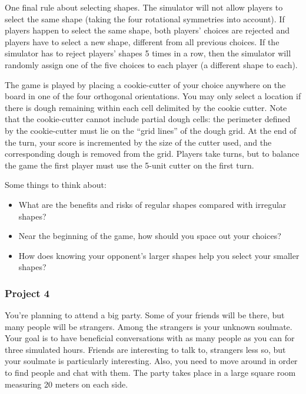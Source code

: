 One final rule about selecting shapes.  The simulator will not allow players to select
the same shape (taking the four rotational symmetries into account).  If players
happen to select the same shape, both players' choices are rejected and players have to
select a new shape, different from all previous choices.  If the simulator has to reject
players' shapes 5 times in a row, then the simulator will randomly assign one of the five
choices to each player (a different shape to each).

The game is played by placing a cookie-cutter of your choice anywhere
on the board in one of the four orthogonal orientations.  You may only
select a location if there is dough remaining within each cell
delimited by the cookie cutter.  Note that the cookie-cutter cannot include partial dough
cells: the perimeter defined by the cookie-cutter must lie on the ``grid lines'' of the dough grid.
At the end of the turn, your score is
incremented by the size of the cutter used, and the corresponding
dough is removed from the grid.  Players take turns, but to balance the
game the first player must use the 5-unit cutter on the first turn.

Some things to think about:
\begin{itemize}
\item What are the benefits and risks of regular shapes compared with irregular shapes?
\item Near the beginning of the game, how should you space out your choices?
\item How does knowing your opponent's larger shapes help you select your smaller shapes?
\end{itemize}
\subsubsection{Project 4}

You're planning to attend a big party.  Some of your friends will be
there, but many people will be strangers.  Among the strangers is your
unknown soulmate.  Your goal is to have beneficial conversations with
as many people as you can for three simulated hours. Friends are
interesting to talk to, strangers less so, but your soulmate is
particularly interesting.  Also, you need to move around in order to
find people and chat with them.  The party takes place in a large
square room measuring 20 meters on each side.

